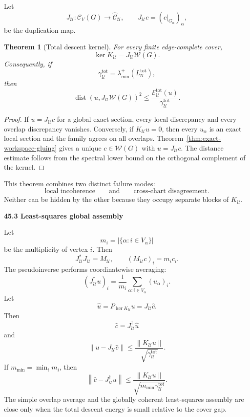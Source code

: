 \documentclass[11pt,letterpaper]{article}
\newcommand{\subtopic}[1]{%
 \vspace{0.45em}
 {\bfseries\color{AccentColor} #1\par}
}
\theoremstyle{plain}
\newtheorem{theorem}{Theorem}
\theoremstyle{definition}
\begin{document}
Let
\[
J_{\mathcal U}:\mathcal C_V(G)\to\widehat{\mathcal C}_{\mathcal U},
\qquad
J_{\mathcal U}c=(c|_{G_\alpha})_\alpha,
\]
be the duplication map.

\begin{theorem}[Total descent kernel]\label{thm:total-descent-kernel}
For every finite edge-complete cover,
\[
\boxed{
\ker K_{\mathcal U}
=
J_{\mathcal U}\mathscr W(G).
}
\]
Consequently, if
\[
\gamma_{\mathcal U}^{\mathrm{tot}}
=
\lambda_{\min}^+
\left(L_{\mathcal U}^{\mathrm{tot}}\right),
\]
then
\[
\boxed{
\operatorname{dist}
\left(
 u,
 J_{\mathcal U}\mathscr W(G)
\right)^2
\leq
\frac{\mathcal E_{\mathcal U}^{\mathrm{tot}}(u)}
{\gamma_{\mathcal U}^{\mathrm{tot}}}.
}
\]
\end{theorem}

\begin{proof}
If \(u=J_{\mathcal U}c\) for a global exact section, every local discrepancy
and every overlap discrepancy vanishes. Conversely, if \(K_{\mathcal U}u=0\),
then every \(u_\alpha\) is an exact local section and the family agrees on all
overlaps. Theorem~\ref{thm:exact-workspace-gluing} gives a unique
\(c\in\mathscr W(G)\) with \(u=J_{\mathcal U}c\). The distance estimate follows
from the spectral lower bound on the orthogonal complement of the kernel.
\end{proof}

This theorem combines two distinct failure modes:
\[
\text{local incoherence}
\qquad\text{and}\qquad
\text{cross-chart disagreement}.
\]
Neither can be hidden by the other because they occupy separate blocks of
\(K_{\mathcal U}\).

\subtopic{45.3 Least-squares global assembly}

Let
\[
m_i=|\{\alpha:i\in V_\alpha\}|
\]
be the multiplicity of vertex \(i\). Then
\[
J_{\mathcal U}^*J_{\mathcal U}=M_{\mathcal U},
\qquad
(M_{\mathcal U}c)_i=m_ic_i.
\]
The pseudoinverse performs coordinatewise averaging:
\[
\boxed{
(J_{\mathcal U}^\dagger u)_i
=
\frac{1}{m_i}
\sum_{\alpha:i\in V_\alpha}(u_\alpha)_i.
}
\]
Let
\[
\widehat u
=
P_{\ker K_{\mathcal U}}u
=
J_{\mathcal U}\widehat c.
\]
Then
\[
\widehat c
=
J_{\mathcal U}^\dagger\widehat u
\]
and
\[
\boxed{
\|u-J_{\mathcal U}\widehat c\|
\leq
\frac{\|K_{\mathcal U}u\|}
{\sqrt{\gamma_{\mathcal U}^{\mathrm{tot}}}}.
}
\]
If \(m_{\min}=\min_i m_i\), then
\[
\boxed{
\left\|
\widehat c-J_{\mathcal U}^\dagger u
\right\|
\leq
\frac{\|K_{\mathcal U}u\|}
{\sqrt{m_{\min}\gamma_{\mathcal U}^{\mathrm{tot}}}}.
}
\]
The simple overlap average and the globally coherent least-squares assembly
are close only when the total descent energy is small relative to the cover
gap.
\end{document}
